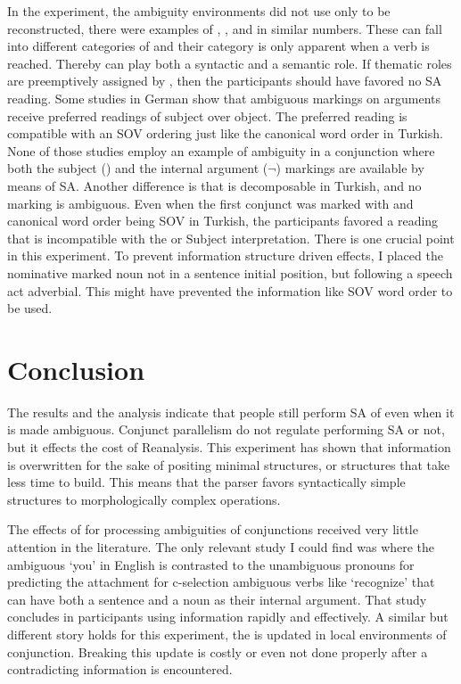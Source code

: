 In the experiment, the ambiguity environments did not use only {\Acc} to be reconstructed, there were examples of {\Dat}, {\Loc}, and {\Abl} in similar numbers. These can fall into different categories of {\Case} \citep{woolford2006lexical} and their category is only apparent when a verb is reached. Thereby {\Case} can play both a syntactic and a semantic role. If thematic roles are preemptively assigned by {\Case}, then the participants should have favored no SA reading. Some studies in German \citep{gorrell2000subject,schlesewsky2000subject,bader2000reanalyis} show that ambiguous {\Case} markings on arguments receive preferred readings of subject over object. The preferred reading is compatible with an SOV ordering just like the canonical word order in Turkish. None of those studies employ an example of {\Case} ambiguity in a conjunction where both the subject ({\Nom}) and the internal argument ({$\neg$\Nom}) {\Case} markings are available by means of SA. Another difference is that {\Case} is decomposable in Turkish, and no {\Case} marking is ambiguous. Even when the first conjunct was marked with {\Nom} and canonical word order being SOV in Turkish, the participants favored a reading that is incompatible with the {\Nom} or Subject interpretation. There is one crucial point in this experiment. To prevent information structure driven effects, I placed the nominative marked noun not in a sentence initial position, but following a speech act adverbial. This might have prevented the information like SOV word order to be used.


\section{Conclusion}

The results and the analysis indicate that people still perform SA of {\Case} even when it is made ambiguous. Conjunct parallelism do not regulate performing SA or not, but it effects the cost of Reanalysis. This experiment has shown that {\Case} information is overwritten for the sake of positing minimal structures, or structures that take less time to build. This means that the parser favors syntactically simple structures to morphologically complex operations.

The effects of {\Case} for processing ambiguities of conjunctions received very little attention in the literature. The only relevant study I could find was \citet{Traxler1996} where the {\Case} ambiguous `you' in English is contrasted to the unambiguous pronouns for predicting the attachment for c-selection ambiguous verbs like `recognize' that can have both a sentence and a noun as their internal argument. That study concludes in participants using {\Case} information rapidly and effectively. A similar but different story holds for this experiment, the {\Case} is updated in local environments of conjunction. Breaking this update is costly or even not done properly after a contradicting information is encountered.
